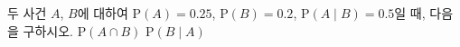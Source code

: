두 사건 $A$, $B$에 대하여 $\mathrm{P}(A)=0.25$, $\mathrm{P}(B)=0.2$, $\mathrm{P}(A\mid B)=0.5$일 때, 다음을 구하시오.
 $\mathrm{P}(A\cap B)$
 $\mathrm{P}(B\mid A)$
